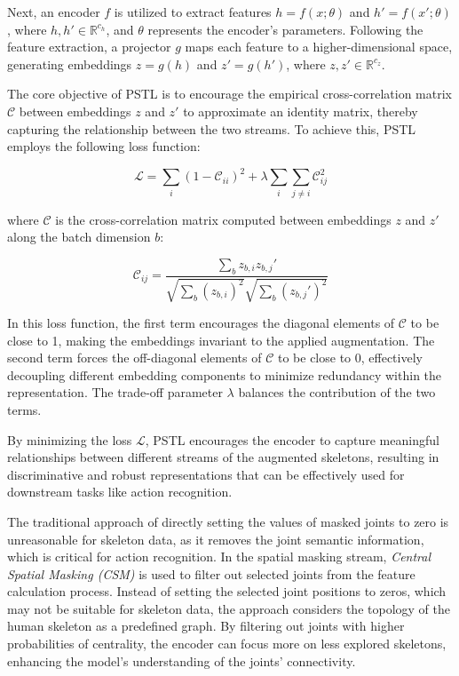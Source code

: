 Next, an encoder \(f\) is utilized to extract features \(h = f(x;\theta)\) and \(h' = f(x';\theta)\), where \(h, h' \in \mathbb{R}^{c_h}\), and \(\theta\) represents the encoder's parameters. Following the feature extraction, a projector \(g\) maps each feature to a higher-dimensional space, generating embeddings \(z = g(h)\) and \(z' = g(h')\), where \(z, z' \in \mathbb{R}^{c_z}\).

The core objective of PSTL is to encourage the empirical cross-correlation matrix \(\mathcal{C}\) between embeddings \(z\) and \(z'\) to approximate an identity matrix, thereby capturing the relationship between the two streams. To achieve this, PSTL employs the following loss function:

\[
\mathcal{L} = \sum_i \left(1 - \mathcal{C}_{ii}\right)^2 + \lambda \sum_i \sum_{j \neq i} \mathcal{C}_{ij}^2
\]

where \(\mathcal{C}\) is the cross-correlation matrix computed between embeddings \(z\) and \(z'\) along the batch dimension \(b\):

\[
\mathcal{C}_{ij} = \frac{\sum_b z_{b,i} z_{b,j}'}{\sqrt{\sum_b\left(z_{b,i}\right)^2} \sqrt{\sum_b\left(z_{b,j}'\right)^2}}
\]

In this loss function, the first term encourages the diagonal elements of \(\mathcal{C}\) to be close to 1, making the embeddings invariant to the applied augmentation. The second term forces the off-diagonal elements of \(\mathcal{C}\) to be close to 0, effectively decoupling different embedding components to minimize redundancy within the representation. The trade-off parameter \(\lambda\) balances the contribution of the two terms.

By minimizing the loss \(\mathcal{L}\), PSTL encourages the encoder to capture meaningful relationships between different streams of the augmented skeletons, resulting in discriminative and robust representations that can be effectively used for downstream tasks like action recognition.

The traditional approach of directly setting the values of masked joints to zero is unreasonable for skeleton data, as it removes the joint semantic information, which is critical for action recognition. In the spatial masking stream, \textit{Central Spatial Masking (CSM)} is used to filter out selected joints from the feature calculation process. Instead of setting the selected joint positions to zeros, which may not be suitable for skeleton data, the approach considers the topology of the human skeleton as a predefined graph. By filtering out joints with higher probabilities of centrality, the encoder can focus more on less explored skeletons, enhancing the model's understanding of the joints' connectivity.

